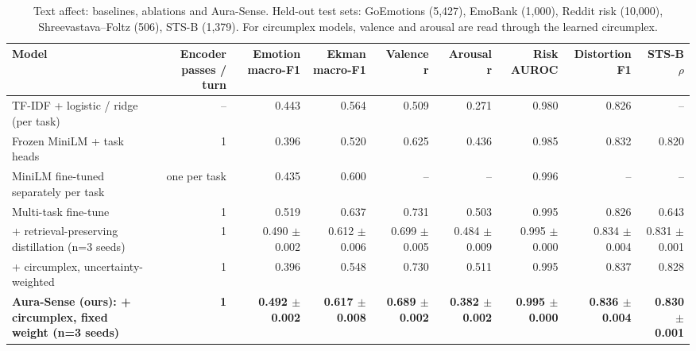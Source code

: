 \begin{table}[t]
\centering
\footnotesize
\caption{Text affect: baselines, ablations and Aura-Sense. Held-out test sets: GoEmotions (5,427), EmoBank (1,000), Reddit risk (10,000), Shreevastava--Foltz (506), STS-B (1,379). For circumplex models, valence and arousal are read through the learned circumplex.}
\label{tab:text}
\setlength{\tabcolsep}{4pt}
\begin{tabular}{lrrrrrrrr}
\toprule
\textbf{Model} & \textbf{Encoder passes / turn} & \textbf{Emotion macro-F1} & \textbf{Ekman macro-F1} & \textbf{Valence r} & \textbf{Arousal r} & \textbf{Risk AUROC} & \textbf{Distortion F1} & \textbf{STS-B $\rho$} \\
\midrule
TF-IDF + logistic / ridge (per task) & -- & 0.443 & 0.564 & 0.509 & 0.271 & 0.980 & 0.826 & -- \\
Frozen MiniLM + task heads & 1 & 0.396 & 0.520 & 0.625 & 0.436 & 0.985 & 0.832 & 0.820 \\
MiniLM fine-tuned separately per task & one per task & 0.435 & 0.600 & -- & -- & 0.996 & -- & -- \\
Multi-task fine-tune & 1 & 0.519 & 0.637 & 0.731 & 0.503 & 0.995 & 0.826 & 0.643 \\
+ retrieval-preserving distillation (n=3 seeds) & 1 & 0.490 $\pm$ 0.002 & 0.612 $\pm$ 0.006 & 0.699 $\pm$ 0.005 & 0.484 $\pm$ 0.009 & 0.995 $\pm$ 0.000 & 0.834 $\pm$ 0.004 & 0.831 $\pm$ 0.001 \\
+ circumplex, uncertainty-weighted & 1 & 0.396 & 0.548 & 0.730 & 0.511 & 0.995 & 0.837 & 0.828 \\
\textbf{Aura-Sense (ours): + circumplex, fixed weight (n=3 seeds)} & \textbf{1} & \textbf{0.492 $\pm$ 0.002} & \textbf{0.617 $\pm$ 0.008} & \textbf{0.689 $\pm$ 0.002} & \textbf{0.382 $\pm$ 0.002} & \textbf{0.995 $\pm$ 0.000} & \textbf{0.836 $\pm$ 0.004} & \textbf{0.830 $\pm$ 0.001} \\
\bottomrule
\end{tabular}
\end{table}
